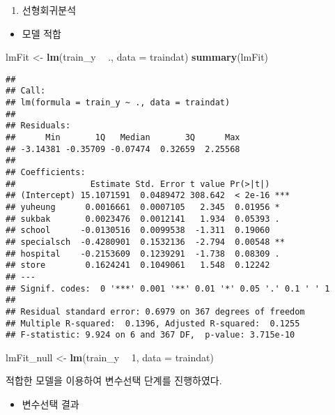 \documentclass[]{article}
\newenvironment{Shaded}{\begin{snugshade}}{\end{snugshade}}
\newcommand{\DataTypeTok}[1]{\textcolor[rgb]{0.13,0.29,0.53}{#1}}
\newcommand{\DecValTok}[1]{\textcolor[rgb]{0.00,0.00,0.81}{#1}}
\newcommand{\KeywordTok}[1]{\textcolor[rgb]{0.13,0.29,0.53}{\textbf{#1}}}
\newcommand{\NormalTok}[1]{#1}
\newcommand{\OperatorTok}[1]{\textcolor[rgb]{0.81,0.36,0.00}{\textbf{#1}}}
\newcommand{\StringTok}[1]{\textcolor[rgb]{0.31,0.60,0.02}{#1}}
\providecommand{\tightlist}{%
  \setlength{\itemsep}{0pt}\setlength{\parskip}{0pt}}
\begin{document}
\begin{enumerate}
\def\labelenumi{\arabic{enumi})}
\setcounter{enumi}{1}
\tightlist
\item
  선형회귀분석
\end{enumerate}

\begin{itemize}
\tightlist
\item
  모델 적합
\end{itemize}

\begin{Shaded}
\begin{Highlighting}[]
\NormalTok{lmFit <-}\StringTok{ }\KeywordTok{lm}\NormalTok{(train_y }\OperatorTok{~}\StringTok{ }\NormalTok{., }\DataTypeTok{data =}\NormalTok{ traindat)}
\KeywordTok{summary}\NormalTok{(lmFit)}
\end{Highlighting}
\end{Shaded}

\begin{verbatim}
## 
## Call:
## lm(formula = train_y ~ ., data = traindat)
## 
## Residuals:
##      Min       1Q   Median       3Q      Max 
## -3.14381 -0.35709 -0.07474  0.32659  2.25568 
## 
## Coefficients:
##               Estimate Std. Error t value Pr(>|t|)    
## (Intercept) 15.1071591  0.0489472 308.642  < 2e-16 ***
## yuheung      0.0016661  0.0007105   2.345  0.01956 *  
## sukbak       0.0023476  0.0012141   1.934  0.05393 .  
## school      -0.0130516  0.0099538  -1.311  0.19060    
## specialsch  -0.4280901  0.1532136  -2.794  0.00548 ** 
## hospital    -0.2153609  0.1239291  -1.738  0.08309 .  
## store        0.1624241  0.1049061   1.548  0.12242    
## ---
## Signif. codes:  0 '***' 0.001 '**' 0.01 '*' 0.05 '.' 0.1 ' ' 1
## 
## Residual standard error: 0.6979 on 367 degrees of freedom
## Multiple R-squared:  0.1396, Adjusted R-squared:  0.1255 
## F-statistic: 9.924 on 6 and 367 DF,  p-value: 3.715e-10
\end{verbatim}

\begin{Shaded}
\begin{Highlighting}[]
\NormalTok{lmFit_null <-}\StringTok{ }\KeywordTok{lm}\NormalTok{(train_y }\OperatorTok{~}\StringTok{ }\DecValTok{1}\NormalTok{, }\DataTypeTok{data =}\NormalTok{ traindat)}
\end{Highlighting}
\end{Shaded}

적합한 모델을 이용하여 변수선택 단계를 진행하였다.

\begin{itemize}
\tightlist
\item
  변수선택 결과
\end{itemize}
\end{document}
